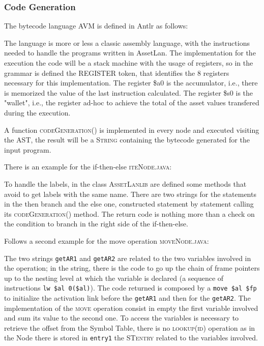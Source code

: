 \documentclass[11pt]{article} %
\begin{document}
\subsubsection{Code Generation}
The bytecode language AVM is defined in Antlr as follows:

The language is more or less a classic assembly language, with the instructions needed to handle the programs written in AssetLan. The implementation for the execution the code will be a stack machine with the usage of registers, so in the grammar is defined the REGISTER token, that identifies the $8$ registers  necessary for this implementation. The register \$a0 is the accumulator, i.e., there is memorized the value of the last instruction calculated. The register \$s0 is the "wallet", i.e., the register ad-hoc to achieve the total of the asset values transfered during the execution.

\medskip

A function \textsc{codeGeneration()} is implemented in every node and executed visiting the AST, the result will be a \textsc{String} containing the bytecode generated for the input program. 

\medskip

There is an example for the if-then-else \textsc{iteNode.java}:

To handle the labels, in the class \textsc{AssetLanlib} are defined some methods that avoid to get labels with the same name. There are two strings for the statements in the then branch and the else one, constructed statement by statement calling its \textsc{codeGeneration()} method. The return code is nothing more than a check on the condition to branch in the right side of the if-then-else.  

\medskip

Follows a second example for the move operation \textsc{moveNode.java}:

The two strings \verb|getAR1| and \verb|getAR2| are related to the two variables involved in the operation; in the string, there is the code to go up the chain of frame pointers up to the nesting level at which the variable is declared (a sequence of instructions \verb|lw $al 0($al)|). The code returned is composed by a \verb|move $al $fp| to initialize the activation link before the \verb|getAR1| and then for the \verb|getAR2|. The implementation of the \textsc{move} operation consist in empty the first variable involved and sum its value to the second one. To access the variables is necessary to retrieve the offset from the Symbol Table, there is no \textsc{lookup(id)} operation as in the Node there is stored in \verb|entry1| the \textsc{STentry} related to the variables involved.
\end{document}
